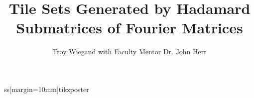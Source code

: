 ss[margin=10mm]{tikzposter}
  \geometry{paperwidth=54in,paperheight=36in}
  \makeatletter
  \usepackage[utf8]{inputenc}
\usepackage[english]{babel}
\setlength{\TP@visibletextwidth}{\textwidth-2\TP@innermargin}
\setlength{\TP@visibletextheight}{\textheight-2\TP@innermargin}
\makeatother
\usepackage{amsmath}
\usepackage{amsthm}

  \theoremstyle{dotless}
\newtheorem{theorem}{Theorem}
\newtheorem*{theorem*}{\textcolor{colorTwo}{\textbf{THEOREM} }}



\usepackage{amsfonts}
\usepackage{color}
\title{ Tile Sets Generated by Hadamard Submatrices of Fourier Matrices}
\author{Troy Wiegand \n with Faculty Mentor Dr. John Herr}
\makeatletter
\newcommand\insertlogoi[2][]{\def\@insertlogoi{\texttt{[image: \#2]}}}
\newcommand\insertlogoii[2][]{\def\@insertlogoii{\texttt{[image: \#2]}}}
\newlength\LogoSep
\setlength\LogoSep{-200pt}

\insertlogoi[height=8cm]{butler_seal.png}
\insertlogoii[height=8cm]{butler_seal.png}


